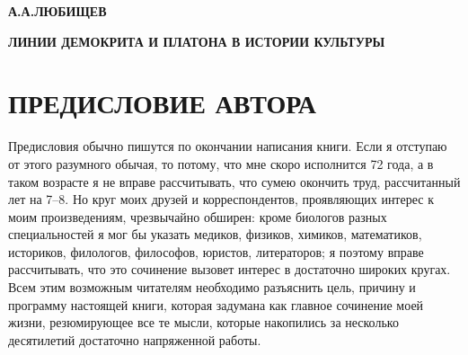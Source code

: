 
\begin{center}
  \textbf{А.А.ЛЮБИЩЕВ}
\end{center}


\begin{center}
  \textbf{ЛИНИИ ДЕМОКРИТА И ПЛАТОНА В ИСТОРИИ КУЛЬТУРЫ}
\end{center}

\clearpage

\section{ПРЕДИСЛОВИЕ АВТОРА}

Предисловия  обычно  пишутся  по  окончании написания  книги.  Если  я
отступаю  от  этого  разумного  обычая,   то  потому,  что  мне  скоро
исполнится  72 года,  а в  таком  возрасте я  не вправе  рассчитывать,
что  сумею окончить  труд,  рассчитанный  лет на  7--8.  Но круг  моих
друзей и  корреспондентов, проявляющих  интерес к  моим произведениям,
чрезвычайно  обширен: кроме  биологов разных  специальностей я  мог бы
указать медиков, физиков,  химиков, математиков, историков, филологов,
философов, юристов,  литераторов; я  поэтому вправе  рассчитывать, что
это сочинение вызовет  интерес в достаточно широких  кругах. Всем этим
возможным читателям  необходимо разъяснить  цель, причину  и программу
настоящей книги,  которая задумана  как главное сочинение  моей жизни,
резюмирующее все те мысли, которые накопились за несколько десятилетий
достаточно напряженной работы.

